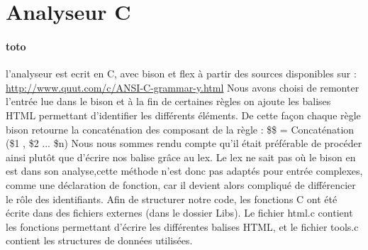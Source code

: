 \documentclass{report}
\begin{document}
\section{Analyseur C}{
\paragraph{toto}{
	l'analyseur est ecrit en C, avec bison et flex à partir des sources disponibles sur : \url{http://www.quut.com/c/ANSI-C-grammar-y.html}
	Nous avons choisi de remonter l'entrée lue dans le bison et à la fin de certaines règles on ajoute les balises HTML permettant d'identifier les différents éléments.
	De cette façon chaque règle bison retourne la concaténation des composant de la règle : \$\$ = Concaténation (\$1 , \$2 ... \$n)
	Nous nous sommes rendu compte qu'il était préférable de procéder ainsi plutôt que d'écrire nos balise grâce au lex. Le lex ne sait pas où le bison en est dans son analyse,cette méthode n'est donc pas adaptés pour entrée complexes, comme une déclaration de fonction, car il devient alors compliqué de différencier le rôle des identifiants.
Afin de structurer notre code, les fonctions C ont été écrite dans des fichiers externes (dans le dossier Libs). Le fichier html.c contient les fonctions permettant d'écrire les différentes balises HTML, et le fichier tools.c contient les structures de données utilisées.
	}
	}
\end{document}
